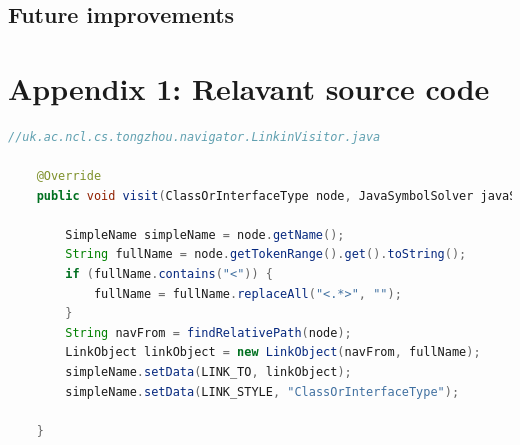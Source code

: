 \documentclass[runningheads]{llncs}
\begin{document}
\subsection{Future improvements}



\newpage



\newpage
\section{Appendix 1: Relavant source code }

\begin{lstlisting}[language=Java, caption=Retrieve all occurrence of class and interface type during visiting]
//uk.ac.ncl.cs.tongzhou.navigator.LinkinVisitor.java

	@Override
    public void visit(ClassOrInterfaceType node, JavaSymbolSolver javaSymbolSolver) {

        SimpleName simpleName = node.getName();
        String fullName = node.getTokenRange().get().toString();
        if (fullName.contains("<")) {
            fullName = fullName.replaceAll("<.*>", "");
        }
        String navFrom = findRelativePath(node);
        LinkObject linkObject = new LinkObject(navFrom, fullName);
        simpleName.setData(LINK_TO, linkObject);
        simpleName.setData(LINK_STYLE, "ClassOrInterfaceType");

    }

\end{lstlisting}
\end{document}
